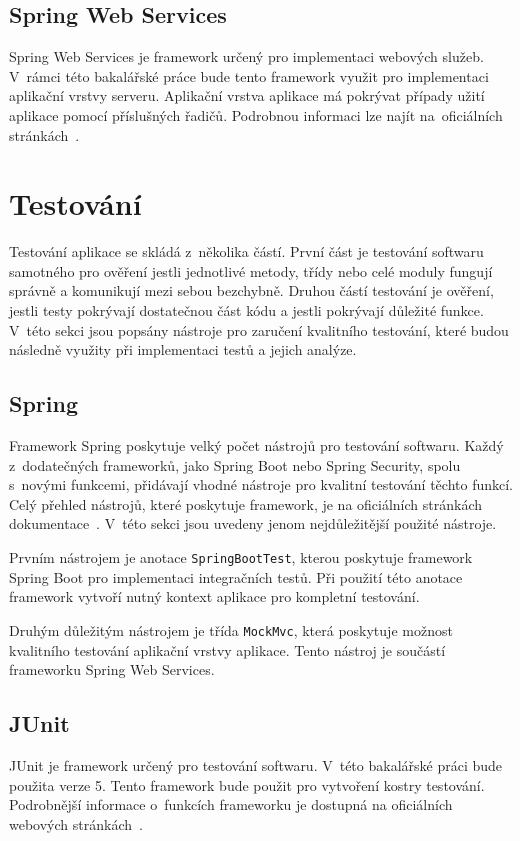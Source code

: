     \subsection{Spring Web Services}
        Spring Web Services je framework určený pro implementaci webových služeb. V~rámci této bakalářské práce bude tento framework využit pro implementaci aplikační vrstvy serveru. Aplikační vrstva aplikace má pokrývat případy užití aplikace pomocí příslušných řadičů. Podrobnou informaci lze najít na~oficiálních stránkách~\cite{spring-web-services}.
        
\section{Testování}\label{reserse:testovani}
    Testování aplikace se skládá z~několika částí. První část je testování softwaru samotného pro ověření jestli jednotlivé metody, třídy nebo celé moduly fungují správně a komunikují mezi sebou bezchybně. Druhou částí testování je ověření, jestli testy pokrývají dostatečnou část kódu a jestli pokrývají důležité funkce. V~této sekci jsou popsány nástroje pro zaručení kvalitního testování, které budou následně využity při implementaci testů a jejich analýze.
    
    \subsection{Spring}
        Framework Spring poskytuje velký počet nástrojů pro testování softwaru. Každý z~dodatečných frameworků, jako Spring Boot nebo Spring Security, spolu s~novými funkcemi, přidávají vhodné nástroje pro kvalitní testování těchto funkcí. Celý přehled nástrojů, které poskytuje framework, je na oficiálních stránkách dokumentace~\cite{spring-tests-doc}. V~této sekci jsou uvedeny jenom nejdůležitější použité nástroje.
        
        Prvním nástrojem je anotace \texttt{SpringBootTest}, kterou poskytuje framework Spring Boot pro implementaci integračních testů. Při použití této anotace framework vytvoří nutný kontext aplikace pro kompletní testování.
        
        Druhým důležitým nástrojem je třída \texttt{MockMvc}, která poskytuje možnost kvalitního testování aplikační vrstvy aplikace. Tento nástroj je součástí frameworku Spring Web Services.
        
    \subsection{JUnit}
        JUnit je framework určený pro testování softwaru. V~této bakalářské práci bude použita verze 5. Tento framework bude použit pro vytvoření kostry testování. Podrobnější informace o~funkcích frameworku je dostupná na oficiálních webových stránkách~\cite{junit-doc}.
        
